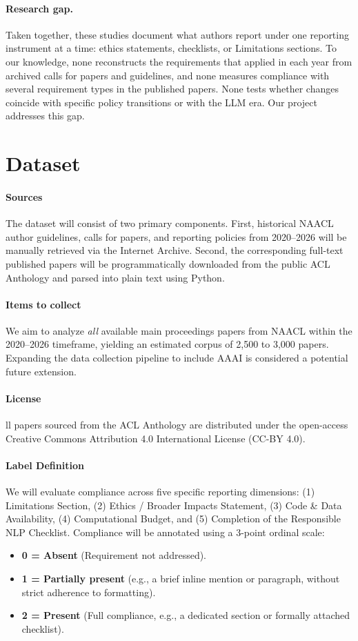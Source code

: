 \documentclass[11pt]{article}
\begin{document}
\paragraph{Research gap.}
Taken together, these studies document what authors report under one reporting instrument at a time: ethics statements, checklists, or Limitations sections.
To our knowledge, none reconstructs the requirements that applied in each year from archived calls for papers and guidelines, and none measures compliance with several requirement types in the published papers.
None tests whether changes coincide with specific policy transitions or with the LLM era.
Our project addresses this gap.

\section{Dataset}
\label{sec:dataset}

\paragraph{Sources}
The dataset will consist of two primary components. First, historical NAACL author guidelines, calls for papers, and reporting policies from 2020--2026 will be manually retrieved via the Internet Archive. Second, the corresponding full-text published papers will be programmatically downloaded from the public ACL Anthology and parsed into plain text using Python. 
\paragraph{Items to collect}
We aim to analyze \textit{all} available main proceedings papers from NAACL within the 2020--2026 timeframe, yielding an estimated corpus of 2,500 to 3,000 papers. Expanding the data collection pipeline to include AAAI is considered a potential future extension.
\paragraph{License}
ll papers sourced from the ACL Anthology are distributed under the open-access Creative Commons Attribution 4.0 International License (CC-BY 4.0).
\paragraph{Label Definition}
We will evaluate compliance across five specific reporting dimensions: (1) Limitations Section, (2) Ethics / Broader Impacts Statement, (3) Code \& Data Availability, (4) Computational Budget, and (5) Completion of the Responsible NLP Checklist. Compliance will be annotated using a 3-point ordinal scale: 
    \begin{itemize}
        \item \textbf{0 = Absent} (Requirement not addressed).
        \item \textbf{1 = Partially present} (e.g., a brief inline mention or paragraph, without strict adherence to formatting).
        \item \textbf{2 = Present} (Full compliance, e.g., a dedicated section or formally attached checklist).
    \end{itemize}
\end{document}
